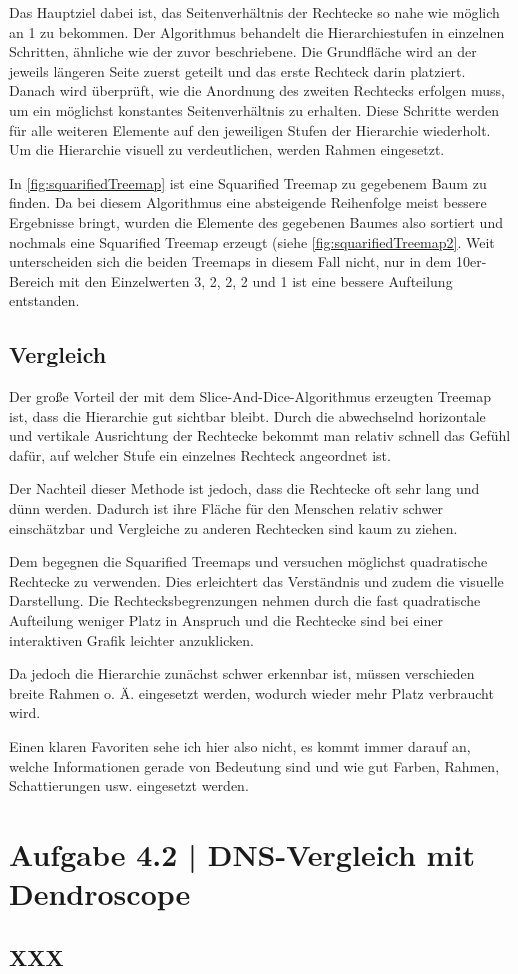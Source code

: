 \documentclass[a4paper,12pt,ngerman]{scrartcl}
\begin{document}
Das Hauptziel dabei ist, das Seitenverhältnis der Rechtecke so nahe wie möglich an 1 zu bekommen. Der Algorithmus behandelt die Hierarchiestufen in einzelnen Schritten, ähnliche wie der zuvor beschriebene. Die Grundfläche wird an der jeweils längeren Seite zuerst geteilt und das erste Rechteck darin platziert. Danach wird überprüft, wie die Anordnung des zweiten Rechtecks erfolgen muss, um ein möglichst konstantes Seitenverhältnis zu erhalten. Diese Schritte werden für alle weiteren Elemente auf den jeweiligen Stufen der Hierarchie wiederholt. Um die Hierarchie visuell zu verdeutlichen, werden Rahmen eingesetzt. 

In \cref{fig:squarifiedTreemap} ist eine Squarified Treemap zu gegebenem Baum zu finden. Da bei diesem Algorithmus eine absteigende Reihenfolge meist bessere Ergebnisse bringt, wurden die Elemente des gegebenen Baumes also sortiert und nochmals eine Squarified Treemap erzeugt (siehe \cref{fig:squarifiedTreemap2}. Weit unterscheiden sich die beiden Treemaps in diesem Fall nicht, nur in dem 10er-Bereich mit den Einzelwerten 3, 2, 2, 2 und 1 ist eine bessere Aufteilung entstanden.

\subsection*{Vergleich}

Der große Vorteil der mit dem Slice-And-Dice-Algorithmus erzeugten Treemap ist, dass die Hierarchie gut sichtbar bleibt. Durch die abwechselnd horizontale und vertikale Ausrichtung der Rechtecke bekommt man relativ schnell das Gefühl dafür, auf welcher Stufe ein einzelnes Rechteck angeordnet ist.

Der Nachteil dieser Methode ist jedoch, dass die Rechtecke oft sehr lang und dünn werden. Dadurch ist ihre Fläche für den Menschen relativ schwer einschätzbar und Vergleiche zu anderen Rechtecken sind kaum zu ziehen.

Dem begegnen die Squarified Treemaps und versuchen möglichst quadratische Rechtecke  zu verwenden. Dies erleichtert das Verständnis und zudem die visuelle Darstellung. Die Rechtecksbegrenzungen nehmen durch die fast quadratische Aufteilung weniger Platz in Anspruch und die Rechtecke sind bei einer interaktiven Grafik leichter anzuklicken. 

Da jedoch die Hierarchie zunächst schwer erkennbar ist, müssen verschieden breite Rahmen o. Ä. eingesetzt werden, wodurch wieder mehr Platz verbraucht wird.

Einen klaren Favoriten sehe ich hier also nicht, es kommt immer darauf an, welche Informationen gerade von Bedeutung sind und wie gut Farben, Rahmen, Schattierungen usw. eingesetzt werden.

\section{Aufgabe 4.2 | DNS-Vergleich mit Dendroscope}
\subsection*{XXX}
\end{document}
